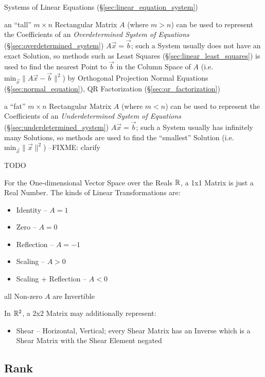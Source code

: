 Systems of Linear Equations (\S\ref{sec:linear_equation_system})

an ``tall'' $m \times n$ Rectangular Matrix $A$ (where $m > n$) can be used to
represent the Coefficients of an \emph{Overdetermined System of Equations}
(\S\ref{sec:overdetermined_system}) $A\vec{x} = \vec{b}$; such a System usually
does not have an exact Solution, so methods such as Least Squares
(\S\ref{sec:linear_least_squares}) is used to find the nearest Point to
$\vec{b}$ in the Column Space of $A$ (i.e.  $\mathrm{min}_{\vec{x}} \|A\vec{x} -
\vec{b}\|^2$) by Orthogonal Projection \fist Normal Equations
(\S\ref{sec:normal_equation}), QR Factorization (\S\ref{sec:qr_factorization})

a ``fat'' $m \times n$ Rectangular Matrix $A$ (where $m < n$) can be used to
represent the Coefficients of an \emph{Underdetermined System of Equations}
(\S\ref{sec:underdetermined_system}) $A\vec{x} = \vec{b}$; such a System
usually has infinitely many Solutions, so methods are used to find the
``smallest'' Solution (i.e. $\mathrm{min}_{\vec{x}} \|\vec{x}\|^2$)
--FIXME: clarify


\asterism

TODO

For the One-dimensional Vector Space over the Reals $\mathbb{R}$, a 1x1 Matrix is
just a Real Number. The kinds of Linear Transformations are:
\begin{itemize}
  \item Identity -- $A = 1$
  \item Zero -- $A = 0$
  \item Reflection -- $A = -1$
  \item Scaling -- $A > 0$
  \item Scaling + Reflection -- $A < 0$
\end{itemize}
all Non-zero $A$ are Invertible

In $\mathbb{R}^2$, a 2x2 Matrix may additionally represent:
\begin{itemize}
  \item Shear -- Horizontal, Vertical; every Shear Matrix has an Inverse which
    is a Shear Matrix with the Shear Element negated
\end{itemize}



\subsection{Rank}\label{sec:rank}

